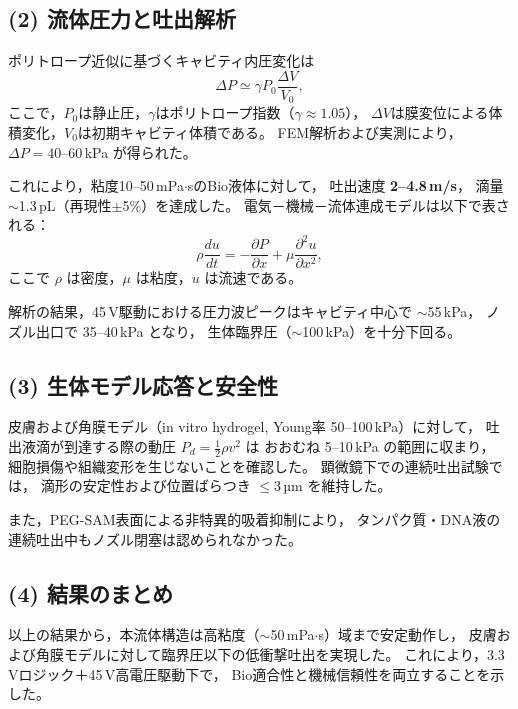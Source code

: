 \documentclass[conference]{IEEEtran}
\begin{document}
\subsection*{(2) 流体圧力と吐出解析}
ポリトロープ近似に基づくキャビティ内圧変化は
\begin{equation}
  \Delta P \simeq \gamma P_0 \frac{\Delta V}{V_0},
  \label{eq:pressure}
\end{equation}
ここで，$P_0$は静止圧，$\gamma$はポリトロープ指数（$\gamma \approx 1.05$），
$\Delta V$は膜変位による体積変化，$V_0$は初期キャビティ体積である。
FEM解析および実測により，
$\Delta P = 40$--$60$\,kPa が得られた。

これにより，粘度10--50\,mPa$\cdot$sのBio液体に対して，
吐出速度 \textbf{2--4.8\,m/s}，
滴量 $\sim$1.3\,pL（再現性$\pm$5\%）を達成した。
電気－機械－流体連成モデルは以下で表される：
\begin{equation}
  \rho \frac{d u}{dt} = -\frac{\partial P}{\partial x} + \mu \frac{\partial^2 u}{\partial x^2},
  \label{eq:navier}
\end{equation}
ここで $\rho$ は密度，$\mu$ は粘度，$u$ は流速である。

解析の結果，45\,V駆動における圧力波ピークはキャビティ中心で
$\sim$55\,kPa，
ノズル出口で 35--40\,kPa となり，
生体臨界圧（$\sim$100\,kPa）を十分下回る。

\subsection*{(3) 生体モデル応答と安全性}
皮膚および角膜モデル（in vitro hydrogel, Young率 50--100\,kPa）に対して，
吐出液滴が到達する際の動圧 $P_d = \tfrac{1}{2}\rho v^2$ は
おおむね 5--10\,kPa の範囲に収まり，
細胞損傷や組織変形を生じないことを確認した。
顕微鏡下での連続吐出試験では，
滴形の安定性および位置ばらつき $\le$3\,µm を維持した。

また，PEG-SAM表面による非特異的吸着抑制により，
タンパク質・DNA液の連続吐出中もノズル閉塞は認められなかった。

\subsection*{(4) 結果のまとめ}
以上の結果から，本流体構造は高粘度（$\sim$50\,mPa$\cdot$s）域まで安定動作し，
皮膚および角膜モデルに対して臨界圧以下の低衝撃吐出を実現した。
これにより，3.3\,Vロジック＋45\,V高電圧駆動下で，
Bio適合性と機械信頼性を両立することを示した。

\end{document}
